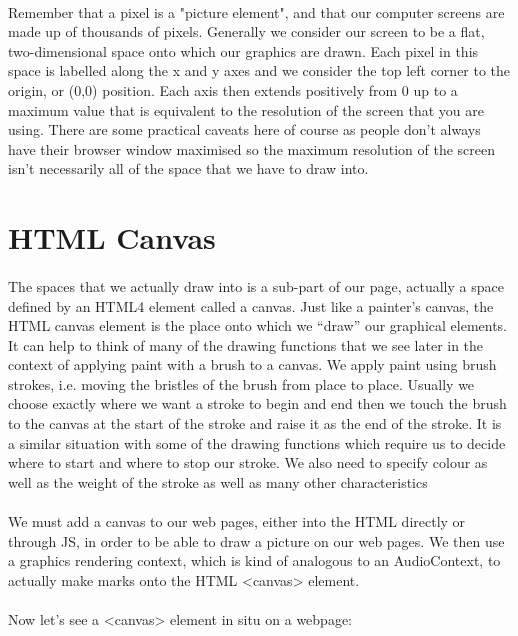 \paragraph{} Remember that a pixel is a "picture element", and that our computer screens are made up of thousands of pixels. Generally we consider our screen to be a flat, two-dimensional space onto which our graphics are drawn. Each pixel in this space is labelled along the x and y axes and we consider the top left corner to the origin, or (0,0) position. Each axis then extends positively from 0 up to a maximum value that is equivalent to the resolution of the screen that you are using. There are some practical caveats here of course as people don't always have their browser window maximised so the maximum resolution of the screen isn't necessarily all of the space that we have to draw into.


\section{HTML Canvas}
\paragraph{} The spaces that we actually draw into is a sub-part of our page, actually a space defined by an HTML4 element called a canvas. Just like a painter’s canvas, the HTML canvas element is the place onto which we “draw” our graphical elements. It can help to think of many of the drawing functions that we see later in the context of applying paint with a brush to a canvas. We apply paint using brush strokes, i.e. moving the bristles of the brush from place to place. Usually we choose exactly where we want a stroke to begin and end then we touch the brush to the canvas at the start of the stroke and raise it as the end of the stroke. It is a similar situation with some of the drawing functions which require us to decide where to start and where to stop our stroke. We also need to specify colour as well as the weight of the stroke as well as many other characteristics
\paragraph{} We must add a canvas to our web pages, either into the HTML directly or through JS, in order to be able to draw a picture on our web pages. We then use a graphics rendering context, which is kind of analogous to an AudioContext, to actually make marks onto the HTML <canvas> element.
\paragraph{} Now let's see a <canvas> element in situ on a webpage:

